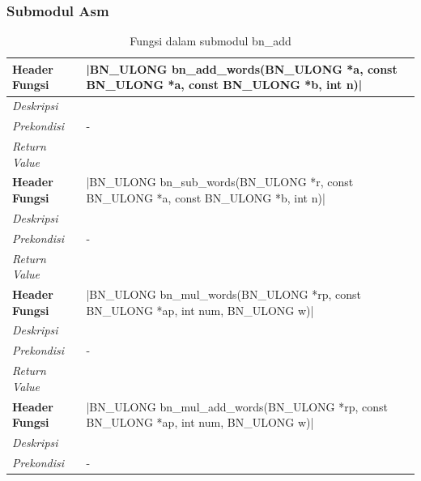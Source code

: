     \subsubsection{Submodul Asm}
      \begin{table}[h]
        \caption{Fungsi dalam submodul bn\_add}
        \begin{tabular}{R{2.8cm}L{10.5cm}}
          \toprule
          \textbf{Header Fungsi} & |BN_ULONG bn_add_words(BN_ULONG *a, const BN_ULONG *a, const BN_ULONG *b, int n)|  \\ \midrule
          \textit{Deskripsi}     &                                                                                    \\
          \textit{Prekondisi}    & -                                                                                  \\
          \textit{Return Value}  &
          \\ \bottomrule
          \textbf{Header Fungsi} & |BN_ULONG bn_sub_words(BN_ULONG *r, const BN_ULONG *a, const BN_ULONG *b, int n)|  \\ \midrule
          \textit{Deskripsi}     &                                                                                    \\
          \textit{Prekondisi}    & -                                                                                  \\
          \textit{Return Value}  &
          \\ \bottomrule
          \textbf{Header Fungsi} & |BN_ULONG bn_mul_words(BN_ULONG *rp, const BN_ULONG *ap, int num, BN_ULONG w)|     \\ \midrule
          \textit{Deskripsi}     &                                                                                    \\
          \textit{Prekondisi}    & -                                                                                  \\
          \textit{Return Value}  &
          \\ \bottomrule
          \textbf{Header Fungsi} & |BN_ULONG bn_mul_add_words(BN_ULONG *rp, const BN_ULONG *ap, int num, BN_ULONG w)| \\ \midrule
          \textit{Deskripsi}     &                                                                                    \\
          \textit{Prekondisi}    & -                                                                                  \\

\end{tabular}
\end{table}

